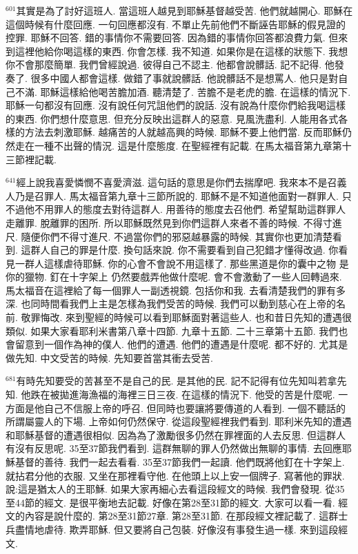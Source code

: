 \documentclass{book}
\begin{document}
$^{601}$其實是為了討好這班人.
當這班人越見到耶穌基督越受苦.
他們就越開心.
耶穌在這個時候有什麼回應.
一句回應都沒有.
不單止先前他們不斷誣告耶穌的假見證的控罪.
耶穌不回答.
錯的事情你不需要回答.
因為錯的事情你回答都浪費力氣.
但來到這裡他給你喝這樣的東西.
你會怎樣.
我不知道.
如果你是在這樣的狀態下.
我想你不會那麼簡單.
我們曾經說過.
彼得自己不認主.
他都會說髒話.
記不記得.
他發奏了.
很多中國人都會這樣.
做錯了事就說髒話.
他說髒話不是想罵人.
他只是對自己不滿.
耶穌這樣給他喝苦膽加酒.
聽清楚了.
苦膽不是老虎的膽.
在這樣的情況下.
耶穌一句都沒有回應.
沒有說任何咒詛他們的說話.
沒有說為什麼你們給我喝這樣的東西.
你們想什麼意思.
但充分反映出這群人的惡意.
見風洗盡利.
人能用各式各樣的方法去刺激耶穌.
越痛苦的人就越高興的時候.
耶穌不要上他們當.
反而耶穌仍然走在一種不出聲的情況.
這是什麼態度.
在聖經裡有記載.
在馬太福音第九章第十三節裡記載.

$^{641}$經上說我喜愛憐憫不喜愛濟滋.
這句話的意思是你們去揣摩吧.
我來本不是召義人乃是召罪人.
馬太福音第九章十三節所說的.
耶穌不是不知道他面對一群罪人.
只不過他不用罪人的態度去對待這群人.
用善待的態度去召他們.
希望幫助這群罪人走離罪.
脫離罪的困所.
所以耶穌既然見到你們這群人來者不善的時候.
不得寸進尺.
隨便你們不得寸進尺.
不過當你們的邪惡越暴露的時候.
其實你也更加清楚看到.
這群人自己的罪是什麼.
換句話來說.
你不需要看到自己犯錯才懂得改過.
你看見一群人這樣虐待耶穌.
你的心會不會說不用這樣了.
那些黑道是你的囊中之物 是你的獵物.
釘在十字架上 仍然要戲弄他做什麼呢.
會不會激動了一些人回轉過來.
馬太福音在這裡給了每一個罪人一副透視鏡.
包括你和我.
去看清楚我們的罪有多深.
也同時間看我們上主是怎樣為我們受苦的時候.
我們可以動到慈心在上帝的名前.
敬罪悔改.
來到聖經的時候可以看到耶穌面對著這些人.
也和昔日先知的遭遇很類似.
如果大家看耶利米書第八章十四節.
九章十五節.
二十三章第十五節.
我們也會留意到一個作為神的僕人.
他們的遭遇.
他們的遭遇是什麼呢.
都不好的.
尤其是做先知.
中文受苦的時候.
先知要首當其衝去受苦.

$^{681}$有時先知要受的苦甚至不是自己的民.
是其他的民.
記不記得有位先知叫若拿先知.
他跌在被拋進海漁福的海裡三日三夜.
在這樣的情況下.
他受的苦是什麼呢.
一方面是他自己不信服上帝的呼召.
但同時也要讓將要傳道的人看到.
一個不聽話的所謂屬靈人的下場.
上帝如何仍然保守.
從這段聖經裡我們看到.
耶利米先知的遭遇和耶穌基督的遭遇很相似.
因為為了激勵很多仍然在罪裡面的人去反思.
但這群人有沒有反思呢.
35至37節我們看到.
這群無聊的罪人仍然做出無聊的事情.
去回應耶穌基督的善待.
我們一起去看看.
35至37節我們一起讀.
他們既將他釘在十字架上.
就拈君分他的衣服.
又坐在那裡看守他.
在他頭上以上安一個牌子.
寫著他的罪狀.
說:這是猶太人的王耶穌.
如果大家再細心去看這段經文的時候.
我們會發現.
從35至44節的經文.
是很平衡地去記載.
好像在第28至31節的經文.
大家可以看一看.
經文的內容是說什麼的.
第28至31節27章.
第28至31節.
在那段經文裡記載了.
這群士兵盡情地虐待.
欺弄耶穌.
但又要將自己包裝.
好像沒有事發生過一樣.
來到這段經文.
\end{document}
